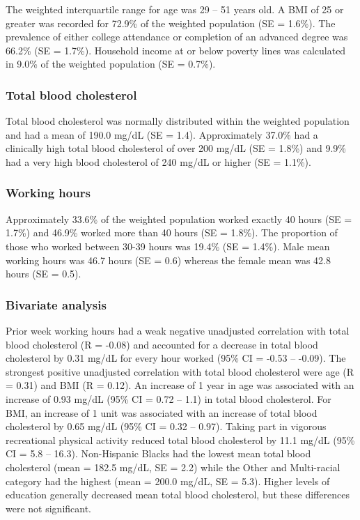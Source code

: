 \documentclass[]{elsarticle} %
\begin{document}
The weighted interquartile range for age was 29 -- 51 years old. A BMI
of 25 or greater was recorded for 72.9\% of the weighted population (SE
= 1.6\%). The prevalence of either college attendance or completion of
an advanced degree was 66.2\% (SE = 1.7\%). Household income at or below
poverty lines was calculated in 9.0\% of the weighted population (SE =
0.7\%).

\hypertarget{total-blood-cholesterol}{%
\subsubsection{Total blood cholesterol}\label{total-blood-cholesterol}}

Total blood cholesterol was normally distributed within the weighted
population and had a mean of 190.0 mg/dL (SE = 1.4). Approximately
37.0\% had a clinically high total blood cholesterol of over 200 mg/dL
(SE = 1.8\%) and 9.9\% had a very high blood cholesterol of 240 mg/dL or
higher (SE = 1.1\%).

\hypertarget{working-hours}{%
\subsubsection{Working hours}\label{working-hours}}

Approximately 33.6\% of the weighted population worked exactly 40 hours
(SE = 1.7\%) and 46.9\% worked more than 40 hours (SE = 1.8\%). The
proportion of those who worked between 30-39 hours was 19.4\% (SE =
1.4\%). Male mean working hours was 46.7 hours (SE = 0.6) whereas the
female mean was 42.8 hours (SE = 0.5).

\hypertarget{bivariate-analysis}{%
\subsubsection{Bivariate analysis}\label{bivariate-analysis}}

Prior week working hours had a weak negative unadjusted correlation with
total blood cholesterol (R = -0.08) and accounted for a decrease in
total blood cholesterol by 0.31 mg/dL for every hour worked (95\% CI =
-0.53 -- -0.09). The strongest positive unadjusted correlation with
total blood cholesterol were age (R = 0.31) and BMI (R = 0.12). An
increase of 1 year in age was associated with an increase of 0.93 mg/dL
(95\% CI = 0.72 -- 1.1) in total blood cholesterol. For BMI, an increase
of 1 unit was associated with an increase of total blood cholesterol by
0.65 mg/dL (95\% CI = 0.32 -- 0.97). Taking part in vigorous
recreational physical activity reduced total blood cholesterol by 11.1
mg/dL (95\% CI = 5.8 -- 16.3). Non-Hispanic Blacks had the lowest mean
total blood cholesterol (mean = 182.5 mg/dL, SE = 2.2) while the Other
and Multi-racial category had the highest (mean = 200.0 mg/dL, SE =
5.3). Higher levels of education generally decreased mean total blood
cholesterol, but these differences were not significant.
\end{document}

